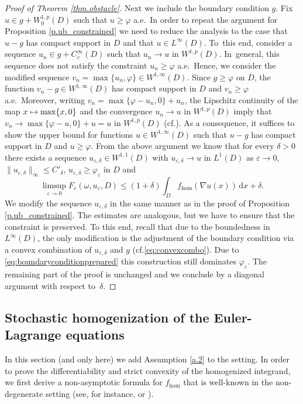 \documentclass[11pt]{article}
\newcommand{\cf}{cf.\xspace}
\numberwithin{equation}{section}
\def\mto{\mathchoice{\longmapsto}{\mapsto}{\mapsto}{\mapsto}}
\theoremstyle{definition}
\let\e\varepsilon
\let\w\omega
\newcommand{\dx}{\,\mathrm{d}x}
\begin{document}
\begin{proof}[Proof of Theorem \ref{thm.obstacle}]
Next we include the boundary condition $g$. Fix $u\in g+W^{1,p}_0(D)$ such that $ u\geq\varphi$ a.e.\ In order to repeat the argument for Proposition \ref{p.ub_constrained} we need to reduce the analysis to the case that $u-g$ has compact support in $D$ and that $u\in L^{\infty}(D)$. To~this end, consider a sequence $u_n\in g+C_c^{\infty}(D)$ such that $u_n\to u$ in $W^{1,p}(D)$. In~general, this sequence does not satisfy the constraint $u_n\geq\varphi$ a.e.\ Hence, we consider the modified sequence $v_n=\max\{u_n,\varphi\}\in W^{1,\infty}(D)$. Since $g\geq\varphi$ on $\overline{D}$, the function $v_n-g\in W^{1,\infty}(D)$ has compact support in $D$ and $v_n\geq\varphi$ a.e.\ Moreover, writing $v_n=\max\{\varphi-u_n,0\}+u_n$, the Lipschitz continuity of the map $x\mto \max\{x,0\}$ and the convergence $u_n\to u$ in $W^{1,p}(D)$ imply that $v_n\to \max\{\varphi-u,0\}+u=u$ in $W^{1,p}(D)$ (\cf \cite[Th.\,1]{MM}). As a consequence, it suffices to show the upper bound for functions $u\in W^{1,\infty}(D)$ such that $u-g$ has compact support in $D$ and $u\geq\varphi$. From the above argument we know that for every $\delta>0$ there exists a sequence $u_{\e,\delta}\in W^{1,1}(D)$ with $u_{\e,\delta}\to u$ in $L^1(D)$ as $\e\to 0$, $\|u_{\e,\delta}\|_{\infty}\leq C'_\delta$, $u_{\e,\delta}\geq \varphi_{\e}$ in $D$ and
\begin{equation*}
\limsup_{\e\to 0}F_{\e}(\w,u_{\e},D)\leq(1+\delta)\int_D f_{\hom}(\nabla u(x))\dx+\delta.
\end{equation*}
We modify the sequence $u_{\e,\delta}$ in the same manner as in the proof of Proposition \ref{p.ub_constrained}. The estimates are analogous, but we have to ensure that the constraint is preserved. To this end, recall that due to the boundedness in $L^{\infty}(D)$, the only modification is the adjustment of the boundary condition via a convex combination of $u_{\e,\delta}$ and $g$ (\cf \eqref{eq:convexcombo}). Due to \eqref{eq:boundaryconditionprepared} this construction still dominates $\varphi_{\e}$. The remaining part of the proof is unchanged and we conclude by a diagonal argument with respect to~$\delta$.
\end{proof}

\subsection{Stochastic homogenization of the Euler-Lagrange equations}
In this section (and only here) we add Assumption \ref{a.2} to the setting. In order to prove the differentiability and strict convexity of the homogenized integrand, we first derive a non-asymptotic formula for $f_{\hom}$ that is well-known in the non-degenerate setting (see, for instance, \cite[Chap.\,15]{JKO} or \cite[Lem.\,3.7]{DG_unbounded}).
\end{document}
